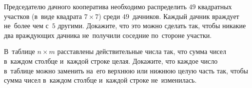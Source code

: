 \begin{problems}
\item
Председателю дачного кооператива необходимо распределить $49$ квадратных
участков (в~виде квадрата $7 \times 7$) среди $49$~дачников.
Каждый дачник враждует не~более чем с~$5$ другими.
Докажите, что это можно сделать так, чтобы никакие два враждующих дачника
не~получили соседние по~стороне участки.

\item
В~таблице $n \times m$ расставлены действительные числа так, что сумма чисел
в~каждом столбце и~каждой строке целая.
Докажите, что каждое число в~таблице можно заменить на~его верхнюю или нижнюю
целую часть так, чтобы сумма чисел в~каждом столбце и~каждой строке
не~изменилась.


\end{problems}

